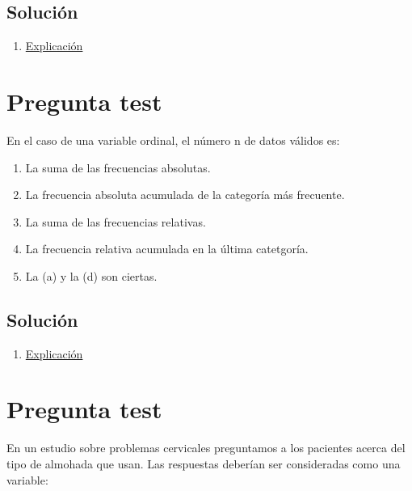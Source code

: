 \documentclass[
]{book}
\providecommand{\tightlist}{%
  \setlength{\itemsep}{0pt}\setlength{\parskip}{0pt}}
\begin{document}
\hypertarget{soluciuxf3n-1}{%
\subsection{Solución}\label{soluciuxf3n-1}}

\begin{enumerate}
\def\labelenumi{\alph{enumi})}
\setcounter{enumi}{1}
\tightlist
\item
  \href{https://1fjmanzano.github.io/bioestadistica/tipos-de-variables.html}{Explicación}
\end{enumerate}

\hypertarget{pregunta-test-2}{%
\section{Pregunta test}\label{pregunta-test-2}}

En el caso de una variable ordinal, el número n de datos válidos es:

\begin{enumerate}
\def\labelenumi{\alph{enumi})}
\tightlist
\item
  La suma de las frecuencias absolutas.
\item
  La frecuencia absoluta acumulada de la categoría más frecuente.
\item
  La suma de las frecuencias relativas.
\item
  La frecuencia relativa acumulada en la última catetgoría.
\item
  La (a) y la (d) son ciertas.
\end{enumerate}

\hypertarget{soluciuxf3n-2}{%
\subsection{Solución}\label{soluciuxf3n-2}}

\begin{enumerate}
\def\labelenumi{\alph{enumi})}
\tightlist
\item
  \href{https://1fjmanzano.github.io/bioestadistica/tablas-de-frecuencias.html}{Explicación}
\end{enumerate}

\hypertarget{pregunta-test-3}{%
\section{Pregunta test}\label{pregunta-test-3}}

En un estudio sobre problemas cervicales preguntamos a los pacientes acerca del tipo de almohada que usan. Las respuestas deberían ser consideradas como una variable:
\end{document}
